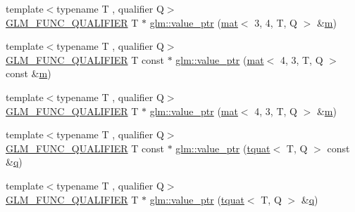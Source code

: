 \begin{DoxyCompactItemize}
{\footnotesize template$<$typename T , qualifier Q$>$ }\\\mbox{\hyperlink{setup_8hpp_a33fdea6f91c5f834105f7415e2a64407}{G\+L\+M\+\_\+\+F\+U\+N\+C\+\_\+\+Q\+U\+A\+L\+I\+F\+I\+ER}} T $\ast$ \mbox{\hyperlink{group__gtc__type__ptr_ga9b9841a59cedf4f06882863900c36787}{glm\+::value\+\_\+ptr}} (\mbox{\hyperlink{structglm_1_1mat}{mat}}$<$ 3, 4, T, Q $>$ \&\mbox{\hyperlink{_s_d_l__opengl__glext_8h_af593500c283bf1a787a6f947f503a5c2}{m}})
\item 
{\footnotesize template$<$typename T , qualifier Q$>$ }\\\mbox{\hyperlink{setup_8hpp_a33fdea6f91c5f834105f7415e2a64407}{G\+L\+M\+\_\+\+F\+U\+N\+C\+\_\+\+Q\+U\+A\+L\+I\+F\+I\+ER}} T const  $\ast$ \mbox{\hyperlink{group__gtc__type__ptr_ga50654758b47589e7dea0aa0bcb50adfb}{glm\+::value\+\_\+ptr}} (\mbox{\hyperlink{structglm_1_1mat}{mat}}$<$ 4, 3, T, Q $>$ const \&\mbox{\hyperlink{_s_d_l__opengl__glext_8h_af593500c283bf1a787a6f947f503a5c2}{m}})
\item 
{\footnotesize template$<$typename T , qualifier Q$>$ }\\\mbox{\hyperlink{setup_8hpp_a33fdea6f91c5f834105f7415e2a64407}{G\+L\+M\+\_\+\+F\+U\+N\+C\+\_\+\+Q\+U\+A\+L\+I\+F\+I\+ER}} T $\ast$ \mbox{\hyperlink{group__gtc__type__ptr_gad33202dd8b191c31df6ed81b63bc2e52}{glm\+::value\+\_\+ptr}} (\mbox{\hyperlink{structglm_1_1mat}{mat}}$<$ 4, 3, T, Q $>$ \&\mbox{\hyperlink{_s_d_l__opengl__glext_8h_af593500c283bf1a787a6f947f503a5c2}{m}})
\item 
{\footnotesize template$<$typename T , qualifier Q$>$ }\\\mbox{\hyperlink{setup_8hpp_a33fdea6f91c5f834105f7415e2a64407}{G\+L\+M\+\_\+\+F\+U\+N\+C\+\_\+\+Q\+U\+A\+L\+I\+F\+I\+ER}} T const  $\ast$ \mbox{\hyperlink{group__gtc__type__ptr_ga8d5728b67f88d8fcce096db3885d74f0}{glm\+::value\+\_\+ptr}} (\mbox{\hyperlink{structglm_1_1tquat}{tquat}}$<$ T, Q $>$ const \&\mbox{\hyperlink{_s_d_l__opengl_8h_a8fc1e7b9baaae687804c7eed46ca09c6}{q}})
\item 
{\footnotesize template$<$typename T , qualifier Q$>$ }\\\mbox{\hyperlink{setup_8hpp_a33fdea6f91c5f834105f7415e2a64407}{G\+L\+M\+\_\+\+F\+U\+N\+C\+\_\+\+Q\+U\+A\+L\+I\+F\+I\+ER}} T $\ast$ \mbox{\hyperlink{group__gtc__type__ptr_ga38e914875e288a10c99139869be4426a}{glm\+::value\+\_\+ptr}} (\mbox{\hyperlink{structglm_1_1tquat}{tquat}}$<$ T, Q $>$ \&\mbox{\hyperlink{_s_d_l__opengl_8h_a8fc1e7b9baaae687804c7eed46ca09c6}{q}})
\end{DoxyCompactItemize}


